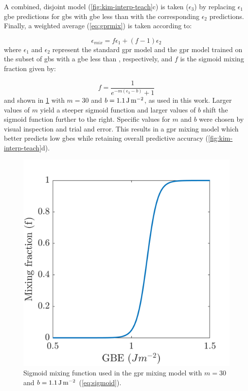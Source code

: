 \documentclass[preprint,12pt]{elsarticle}
\begin{document}
	A combined, disjoint model (\cref{fig:kim-interp-teach}c) is taken ($\epsilon_3$) by replacing $\epsilon_1$ \gls{gbe} predictions for \glspl{gb} with \gls{gbe} less than \thr{} with the corresponding $\epsilon_2$ predictions. Finally, a weighted average (\cref{eq:gprmix}) is taken according to:
	
	\begin{equation}
		\epsilon_{mix} = f \epsilon_1+(f-1) \epsilon_2
		\label{eq:gprmix}
	\end{equation}
	where $\epsilon_1$ and $\epsilon_2$ represent the standard \gls{gpr} model and the \gls{gpr} model trained on the subset of \glspl{gb} with a \gls{gbe} less than \thrtwo{}, respectively, and $f$ is the sigmoid mixing fraction given by:
	
	\begin{equation}
		f=\frac{1}{e^{-m \left(\epsilon_3-b\right)}+1}
		\label{eq:sigmoid}
	\end{equation}
	and shown in \cref{fig:gprmix-sigmoid} with $m=30$ and $b=\SI{1.1}{\joule\per\square\meter}{}$, as used in this work. Larger values of $m$ yield a steeper sigmoid function and larger values of $b$ shift the sigmoid function further to the right. Specific values for $m$ and $b$ were chosen by visual inspection and trial and error. This results in a \gls{gpr} mixing model which better predicts low \glspl{gbe} while retaining overall predictive accuracy (\cref{fig:kim-interp-teach}d).
	
	\begin{figure}
		\centering
		\includegraphics[scale=1]{figures/gprmix-sigmoid.png}
		\caption{Sigmoid mixing function used in the \gls{gpr} mixing model with $m=30$ and $b=\SI{1.1}{\joule\per\square\meter}{}$ (\cref{eq:sigmoid}).}
		\label{fig:gprmix-sigmoid}
	\end{figure}
	
\end{document}
